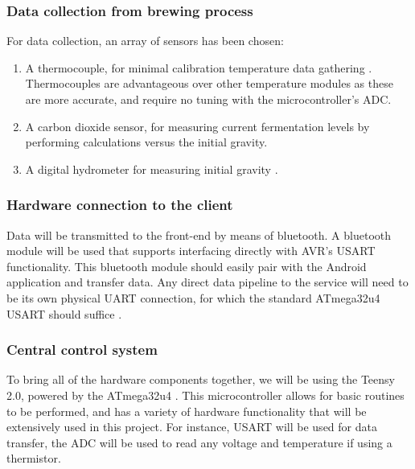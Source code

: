 \documentclass[draftclsnofoot,onecolumn,letterpaper,10pt]{IEEEtran}
\begin{document}
\subsubsection{Data collection from brewing process}
For data collection, an array of sensors has been chosen:
\begin{enumerate}
	\item A thermocouple, for minimal calibration temperature data gathering \cite{thermocouple}. Thermocouples are advantageous over other 
		temperature modules as these are more accurate, and require no tuning with the microcontroller's ADC.
	\item A carbon dioxide sensor, for measuring current fermentation levels by performing calculations versus the initial gravity.
	\item A digital hydrometer for measuring initial gravity \cite{makingmead}.
\end{enumerate}
\subsubsection{Hardware connection to the client}
Data will be transmitted to the front-end by means of bluetooth. A bluetooth module will be used that supports interfacing directly with AVR's
USART functionality. This bluetooth module should easily pair with the Android application and transfer data. Any direct data pipeline to the service
will need to be its own physical UART connection, for which the standard ATmega32u4 USART should suffice \cite{datasheet}.

\subsubsection{Central control system}
To bring all of the hardware components together, we will be using the Teensy 2.0, powered by the ATmega32u4 \cite{teensy}.
This microcontroller allows for basic routines to be performed, and has a variety of hardware functionality that will be extensively used in this project.
For instance, USART will be used for data transfer, the ADC will be used to read any voltage and temperature if using a thermistor.
\end{document}
